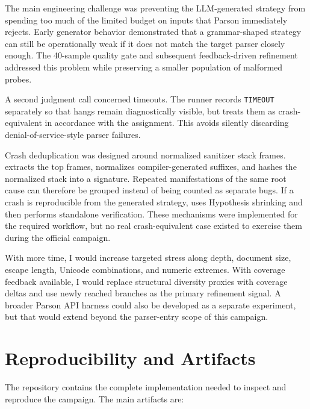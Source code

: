 \documentclass[10pt,a4paper]{article}
\begin{document}
The main engineering challenge was preventing the LLM-generated strategy from spending too much of the limited budget on inputs that
Parson immediately rejects. Early generator behavior demonstrated that a grammar-shaped strategy can still be operationally weak if it
does not match the target parser closely enough. The 40-sample quality gate and subsequent feedback-driven refinement addressed this
problem while preserving a smaller population of malformed probes.

A second judgment call concerned timeouts. The runner records \texttt{TIMEOUT} separately so that hangs remain diagnostically visible,
but treats them as crash-equivalent in accordance with the assignment. This avoids silently discarding denial-of-service-style parser
failures.

Crash deduplication was designed around normalized sanitizer stack frames.  extracts the top frames,
normalizes compiler-generated suffixes, and hashes the normalized stack into a  signature. Repeated manifestations of
the same root cause can therefore be grouped instead of being counted as separate bugs. If a crash is reproducible from the generated
strategy,  uses Hypothesis shrinking and then performs standalone verification. These mechanisms were
implemented for the required workflow, but no real crash-equivalent case existed to exercise them during the official campaign.

With more time, I would increase targeted stress along depth, document size, escape length, Unicode combinations, and numeric extremes.
With coverage feedback available, I would replace structural diversity proxies with coverage deltas and use newly reached branches as the
primary refinement signal. A broader Parson API harness could also be developed as a separate experiment, but that would extend beyond
the parser-entry scope of this campaign.

\section{Reproducibility and Artifacts}

The repository contains the complete implementation needed to inspect and
reproduce the campaign. The main artifacts are:
\end{document}
